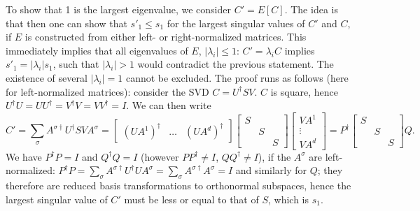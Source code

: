 To show that 1 is the largest eigenvalue\cite{Weichselbaum05}, we consider $C' = E[C]$. The idea is that then one can show that $s'_1 \leq s_1$ for the largest singular values of $C'$ and $C$, if $E$ is constructed from either left- or right-normalized matrices. This immediately implies that all eigenvalues of $E$, $|\lambda_i| \leq 1$: $C'=\lambda_i C$ implies $s'_1 = |\lambda_i| s_1$, such that $|\lambda_i|>1$ would contradict the previous statement. The existence of several $|\lambda_i|=1$ cannot be excluded.
The proof runs as follows (here for left-normalized matrices): consider the SVD $C = U^\dagger S V$. $C$ is square, hence $U^\dagger U = UU^\dagger = V^\dagger V = VV^\dagger = I$. We can then write 
\begin{equation}
C' = \sum_\sigma A^{\sigma\dagger} U^\dagger S V A^{\sigma} = 
\left[ \begin{array}{ccc} (UA^1)^\dagger & \ldots  & (UA^d)^\dagger \end{array} \right]
\left[ \begin{array}{ccc} S & & \\ & S & \\ & & S \end{array} \right]
\left[ \begin{array}{c} VA^1 \\ \vdots \\ VA^d \end{array} \right] = P^\dagger \left[ \begin{array}{ccc} S & & \\ & S & \\ & & S \end{array} \right] Q .
\end{equation}
We have $P^\dagger P = I$ and $Q^\dagger Q = I$ (however $PP^\dagger \neq I$, $QQ^\dagger \neq I$), if the $A^\sigma$ are left-normalized: $P^\dagger P =\sum_\sigma A^{\sigma\dagger} U^\dagger U A^\sigma = \sum_\sigma A^{\sigma\dagger} A^\sigma = I$ and similarly for $Q$; they therefore are reduced basis transformations to orthonormal subspaces, hence the largest singular value of $C'$ must be less or equal to that of $S$, which is $s_1$.

